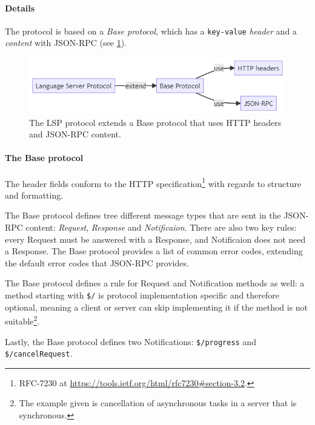 \paragraph*{Details}
The protocol is based on a \emph{Base protocol}, which has a \texttt{key-value} \emph{header} and a \emph{content} with \gls{JSON-RPC} (see \cref{fig:lsp-protocol}).

\begin{figure}[htbp]
  \centering
  \includegraphics[width=\textwidth]{figures/lsp-protocol}
  \caption[The LSP Protocol]{The LSP protocol extends a Base protocol that uses HTTP headers and JSON-RPC content.}\label{fig:lsp-protocol}
\end{figure}

\paragraph*{The Base protocol}
The header fields conform to the HTTP specification\footnote{RFC-7230 at \href{https://tools.ietf.org/html/rfc7230\#section-3.2}{https://tools.ietf.org/html/rfc7230\#section-3.2}.} with regards to structure and formatting.

The Base protocol defines tree different message types that are sent in the \gls{JSON-RPC} content: \emph{Request}, \emph{Response} and \emph{Notificaion}.
There are also two key rules: every Request must be answered with a Response, and Notificaion does not need a Response.
The Base protocol provides a list of common error codes, extending the default error codes that \gls{JSON-RPC} provides.~\cite{microsoftLanguageServerProtocol2020}

The Base protocol defines a rule for Request and Notification methods as well: a method starting with \texttt{\$/} is protocol implementation specific and therefore optional, meaning a client or server can skip implementing it if the method is not suitable\footnote{The example given is cancellation of asynchronous tasks in a server that is synchronous.}.~\cite{microsoftLanguageServerProtocol2020}

Lastly, the Base protocol defines two Notifications: \texttt{\$/progress} and \texttt{\$/cancelRequest}.~\cite{microsoftLanguageServerProtocol2020}

